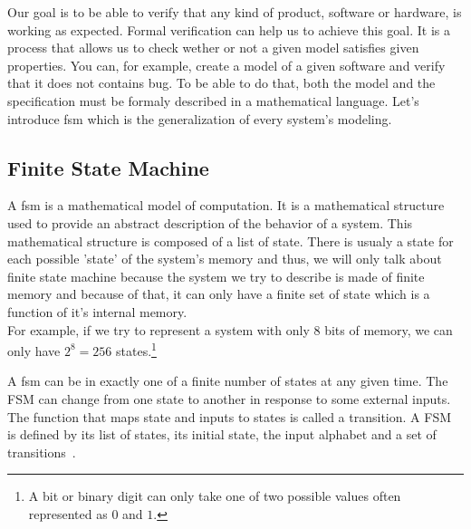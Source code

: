 \documentclass[12pt]{article}
\begin{document}
Our goal is to be able to verify that any kind of product, software or hardware, is working as expected. Formal verification can help us to achieve this goal. It is a process that allows us to check wether or not a given model satisfies given properties. You can, for example, create a model of a given software and verify that it does not contains bug. To be able to do that, both the model and the specification must be formaly described in a mathematical language. Let's introduce \gls{fsm} which is the generalization of every system's modeling.\\



\subsection{Finite State Machine}

A \gls{fsm} is a mathematical model of computation. It is a mathematical structure used to provide an abstract description of the behavior of a system. This mathematical structure is composed of a list of state. There is usualy a state for each possible 'state' of the system's memory and thus, we will only talk about finite state machine because the system we try to describe is made of finite memory and because of that, it can only have a finite set of state which is a function of it's internal memory.\\

For example, if we try to represent a system with only 8 bits of memory, we can only have $2^8 = 256$ states.\footnote{A bit or binary digit can only take one of two possible values often represented as $0$ and $1$.}

A \gls{fsm} can be in exactly one of a finite number of states at any given time. The FSM can change from one state to another in response to some external inputs. The function that maps state and inputs to states is called a transition. A FSM is defined by its list of states, its initial state, the input alphabet and a set of transitions~\cite{FSM:2017}.\\
\end{document}

